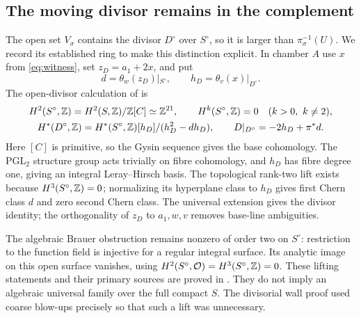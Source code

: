 \subsection{The moving divisor remains in the complement}
The open set $V_\sigma$ contains the divisor $D^\circ$
over $S^\circ$, so it is larger than $\pi_\sigma^{-1}(U)$.
We record its established ring to make this distinction
explicit. In chamber $A$ use $x$ from \eqref{eq:witness},
set $z_D=a_1+2x$, and put
\[
 d=\theta_w(z_D)|_{S^\circ},\qquad
 h_D=\theta_v(x)|_{D^\circ}.
\]
The open-divisor calculation of \cite[\S7]{wuebben17} is
\begin{equation}\label{eq:moving-ring}
 \begin{gathered}
 H^2(S^\circ,\mathbb Z)=H^2(S,\mathbb Z)/\mathbb Z[C]\simeq\mathbb Z^{21},\qquad
 H^k(S^\circ,\mathbb Z)=0\quad(k>0,\ k\ne2),\\
 H^*(D^\circ,\mathbb Z)=H^*(S^\circ,\mathbb Z)[h_D]/(h_D^2-dh_D),\qquad
 D|_{D^\circ}=-2h_D+\pi^*d.
 \end{gathered}
\end{equation}
Here $[C]$ is primitive, so the Gysin sequence gives the
base cohomology. The $\mathrm{PGL}_2$ structure group acts
trivially on fibre cohomology, and $h_D$ has fibre degree
one, giving an integral Leray--Hirsch basis. The topological
rank-two lift exists because $H^3(S^\circ,\mathbb Z)=0$;
normalizing its hyperplane class to $h_D$ gives first
Chern class $d$ and zero second Chern class. The universal
extension gives the divisor identity; the orthogonality
of $z_D$ to $a_1,w,v$ removes base-line ambiguities.

The algebraic Brauer obstruction remains nonzero of order
two on $S^\circ$: restriction to the function field is
injective for a regular integral surface. Its analytic
image on this open surface vanishes, using
$H^2(S^\circ,\mathcal O)=H^3(S^\circ,\mathbb Z)=0$. These lifting
statements and their primary sources are proved in
\cite[\S7.1]{wuebben17}. They do not imply an algebraic
universal family over the full compact $S$. The divisorial
wall proof used coarse blow-ups precisely so that such a
lift was unnecessary.
